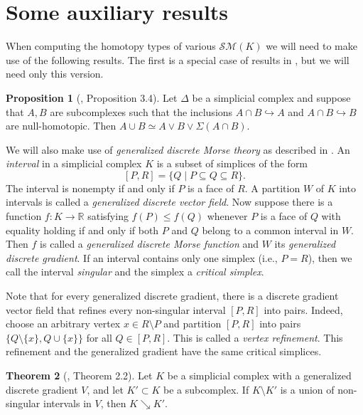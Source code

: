 \documentclass{amsart}
\theoremstyle{definition}
\newtheorem{theorem}{Theorem}[section]
\newtheorem{proposition}[theorem]{Proposition}
\newcommand{\zr}{{\mathbb R}}
\newcommand{\sm}{{\mathcal{SM}}}
\begin{document}
\section{Some auxiliary results}\label{sec:aux} When computing the homotopy types of various $\sm(K)$ we will need to make use of the following results. The first is a special case of results in \cite{WelkerZiegler1999}, but we will need only this version.

\begin{proposition}[\cite{ChariJoswig2005}, Proposition 3.4]\label{wedgeprop} 
    Let $\Delta$ be a simplicial complex and suppose that $A,B$ are subcomplexes such that the inclusions $A\cap B\hookrightarrow A$ and $A\cap B\hookrightarrow B$ are null-homotopic. Then $A\cup B\simeq A\vee B\vee \Sigma(A\cap B)$.
\end{proposition}

We will also make use of {\em generalized discrete Morse theory} as described in \cite{BauerEdelsbrunner2017}. An {\em interval} in a simplicial complex $K$ is a subset of simplices of the form $$[P,R] = \{Q\mid P\subseteq Q\subseteq R\}.$$  The interval is nonempty if and only if $P$ is a face of $R$. A partition $W$ of $K$ into intervals is called a {\em generalized discrete vector field}. Now suppose there is a function $f:K\to\zr$ satisfying $f(P)\le f(Q)$ whenever $P$ is a face of $Q$ with equality holding if and only if both $P$ and $Q$ belong to a common interval in $W$. Then $f$ is called a {\em generalized discrete Morse function} and $W$ its {\em generalized discrete gradient}. If an interval contains only one simplex (i.e., $P=R$), then we call the interval {\em singular} and the simplex a {\em critical simplex}. 

Note that for every generalized discrete gradient, there is a discrete gradient vector field that refines every non-singular interval $[P,R]$ into pairs. Indeed, choose an arbitrary vertex $x\in R\setminus P$ and partition $[P,R]$ into pairs $\{Q\setminus \{x\},Q\cup\{x\}\}$ for all $Q\in [P,R]$. This is called a {\em vertex refinement}. This refinement and the generalized gradient have the same critical simplices. 

\begin{theorem}[\cite{BauerEdelsbrunner2017}, Theorem 2.2]\label{gencollapse}
    Let $K$ be a simplicial complex with a generalized discrete gradient $V$, and let $K'\subset K$ be a subcomplex. If $K\setminus K'$ is a union of non-singular intervals in $V$, then $K\searrow K'$.
\end{theorem}
\end{document}
